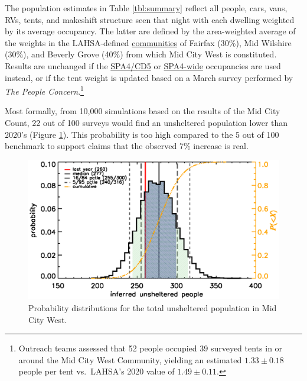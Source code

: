 \documentclass[11pt]{article}
\begin{document}
 The population estimates in Table \ref{tbl:summary} reflect all 
people, cars, vans, RVs, tents, and makeshift structure seen that night with each
dwelling weighted by its average occupancy. The latter are defined by the area-weighted 
average of the weights in the LAHSA-defined 
\href{https://www.lahsa.org/documents?id=4686-2020-greater-los-angeles-city-community-homelessness-report-service-planning-area-4.pdf}{communities} of Fairfax (30\%), Mid Wilshire (30\%), and 
Beverly Grove (40\%) from which Mid City West is constituted. Results are unchanged if 
the \href{https://www.lahsa.org/documents?id=4635-usc-2018-2020-multipliers-and-estimates-overview}
{SPA4/CD5} or \href{https://www.lahsa.org/documents?id=4693-2020-greater-los-angeles-homeless-count-cvrtm-conversion-factors}{SPA4-wide} occupancies are used instead, or if the tent weight is 
updated based on a March survey performed by {\it The People Concern}.\footnote{Outreach teams 
assessed that 52 people occupied 39 surveyed tents in or around the Mid City West Community,
yielding an estimated $1.33\pm0.18$ people per tent vs.~LAHSA's 2020 value of $1.49\pm0.11$.}

Most formally, from 10,000 simulations based on the results of the Mid City Count, 22 out of 100 surveys 
would find an unsheltered population lower than 2020's (Figure \ref{fig:hist}). This probability is too 
high compared to the 5 out of 100 benchmark to support claims that the observed 7\% increase is real.

\begin{figure}
	\centering
	\includegraphics[width=\linewidth, trim = 0cm 0cm 0cm 0cm]{mcw2021Hist}
	\caption{Probability distributions for the total unsheltered population in Mid City West.}
	\label{fig:hist}
\end{figure} 
\end{document}
